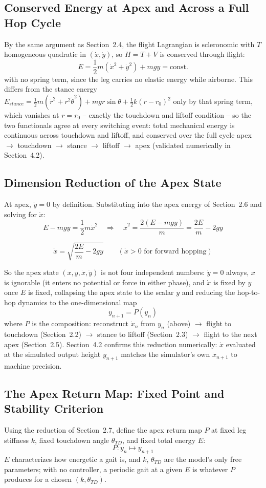 \documentclass[11pt]{article}
\begin{document}
\subsection{Conserved Energy at Apex and Across a Full Hop Cycle}
By the same argument as Section~2.4, the flight Lagrangian is
scleronomic with $T$ homogeneous quadratic in $(\dot x,\dot y)$, so
$H=T+V$ is conserved through flight:
\[
    E = \frac12m(\dot x^2+\dot y^2)+mgy = \text{const.}
\]
with no spring term, since the leg carries no elastic energy while
airborne. This differs from the stance energy
$E_{stance}=\tfrac12m(\dot r^2+r^2\dot\theta^2)+mgr\sin\theta
+\tfrac12k(r-r_0)^2$ only by that spring term, which vanishes at
$r=r_0$ -- exactly the touchdown and liftoff condition -- so the two
functionals agree at every switching event: total mechanical energy is
continuous across touchdown and liftoff, and conserved over the full
cycle apex $\to$ touchdown $\to$ stance $\to$ liftoff $\to$ apex
(validated numerically in Section~4.2).

\subsection{Dimension Reduction of the Apex State}
At apex, $\dot y=0$ by definition. Substituting into the apex energy
of Section~2.6 and solving for $\dot x$:
\[
    E-mgy = \frac12m\dot x^2 \quad\Longrightarrow\quad
    \dot x^2 = \frac{2(E-mgy)}{m} = \frac{2E}{m}-2gy
\]
\begin{result}
\[
    \dot x = \sqrt{\frac{2E}{m}-2gy} \qquad (\dot x>0\text{ for forward hopping})
\]
\end{result}
So the apex state $(x,y,\dot x,\dot y)$ is not four independent
numbers: $\dot y=0$ always, $x$ is ignorable (it enters no potential
or force in either phase), and $\dot x$ is fixed by $y$ once $E$ is
fixed, collapsing the apex state to the scalar $y$ and reducing the
hop-to-hop dynamics to the one-dimensional map
\[
    y_{n+1} = P(y_n)
\]
where $P$ is the composition: reconstruct $\dot x_n$ from $y_n$
(above) $\to$ flight to touchdown (Section~2.2) $\to$ stance to
liftoff (Section~2.3) $\to$ flight to the next apex (Section~2.5).
Section~4.2 confirms this reduction numerically: $\dot x$ evaluated at
the simulated output height $y_{n+1}$ matches the simulator's own
$\dot x_{n+1}$ to machine precision.

\subsection{The Apex Return Map: Fixed Point and Stability Criterion}
\label{sec:apexmapdef}
Using the reduction of Section~2.7, define the apex return map $P$ at
fixed leg stiffness $k$, fixed touchdown angle $\theta_{TD}$, and
fixed total energy $E$:
\[
    P: y_n \mapsto y_{n+1}
\]
$E$ characterizes how energetic a gait is, and $k$, $\theta_{TD}$ are
the model's only free parameters; with no controller, a periodic gait
at a given $E$ is whatever $P$ produces for a chosen
$(k,\theta_{TD})$.
\end{document}
